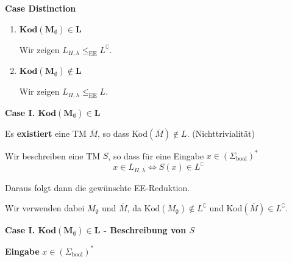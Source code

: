 \documentclass[a4paper, 11pt]{article}
\newcommand\myTitle[1]{{\large \textbf {#1}}}
\begin{document}
                        \textbf{Case Distinction}
                        \begin{enumerate}[label=\Roman*.]
                            \item $\mathbf{\textbf{Kod}(M_{\emptyset}) \in L}$
                            
                            Wir zeigen $L_{H, \lambda} \leq_{\text{EE}} L^\complement$.
                            \item $\mathbf{\textbf{Kod}(M_{\emptyset}) \notin L}$
                            
                            Wir zeigen $L_{H, \lambda} \leq_{\text{EE}} L$.
                        \end{enumerate}
                    
                    
                    
                        \myTitle{Case I.  $\mathbf{\textbf{Kod}(M_{\emptyset}) \in L}$}
                        
                        Es \textbf{existiert} eine TM $\overline{M}$, so dass Kod$(\overline{M}) \notin L$. (Nichttrivialität)
                    
                        
                        Wir beschreiben eine TM $S$, so dass für eine Eingabe $x \in (\Sigma_{\text{bool}})^*$
                        $$x \in L_{H, \lambda} \iff S(x) \in L^\complement$$
                    
                        Daraus folgt dann die gewünschte EE-Reduktion.
                    
                        
                        Wir verwenden dabei $M_{\emptyset}$ und $\overline{M}$, da $\text{Kod}(M_{\emptyset}) \notin L^\complement$ und Kod$(\overline{M}) \in L^\complement$.
                    
                    
                    
                        \myTitle{Case I.  $\mathbf{\textbf{Kod}(M_{\emptyset}) \in L}$ - Beschreibung von $S$}

                        \textbf{Eingabe} $x \in (\Sigma_{\text{bool}})^*$
                    
\end{document}
